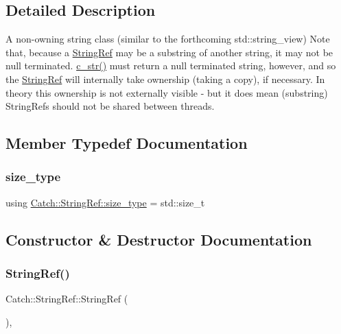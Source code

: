 \subsection{Detailed Description}
A non-\/owning string class (similar to the forthcoming std\+::string\+\_\+view) Note that, because a \mbox{\hyperlink{class_catch_1_1_string_ref}{String\+Ref}} may be a substring of another string, it may not be null terminated. \mbox{\hyperlink{class_catch_1_1_string_ref_a1669cb2765e820ca258159676cbd82a5}{c\+\_\+str()}} must return a null terminated string, however, and so the \mbox{\hyperlink{class_catch_1_1_string_ref}{String\+Ref}} will internally take ownership (taking a copy), if necessary. In theory this ownership is not externally visible -\/ but it does mean (substring) String\+Refs should not be shared between threads. 

\subsection{Member Typedef Documentation}
\mbox{\label{class_catch_1_1_string_ref_a06b4db8fc82b197004291cf370b2ba7c}} 
\subsubsection{\texorpdfstring{size\+\_\+type}{size\_type}}
{\footnotesize\ttfamily using \mbox{\hyperlink{class_catch_1_1_string_ref_a06b4db8fc82b197004291cf370b2ba7c}{Catch\+::\+String\+Ref\+::size\+\_\+type}} =  std\+::size\+\_\+t}



\subsection{Constructor \& Destructor Documentation}
\mbox{\label{class_catch_1_1_string_ref_a94319c75df6542327c93a312c6a80754}} 
\subsubsection{\texorpdfstring{String\+Ref()}{StringRef()}\hspace{0.1cm}{\footnotesize\ttfamily [1/6]}}
{\footnotesize\ttfamily Catch\+::\+String\+Ref\+::\+String\+Ref (\begin{DoxyParamCaption}{ }\end{DoxyParamCaption})\hspace{0.3cm}{\ttfamily [inline]}, {\ttfamily [noexcept]}}

